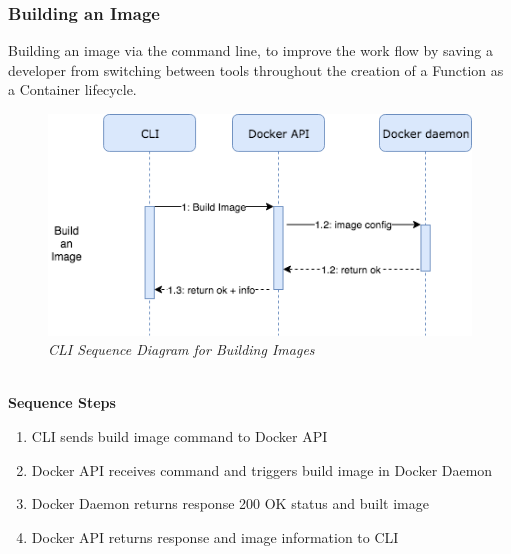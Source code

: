 \subsubsection{Building an Image}
Building an image via the command line, to improve the work flow by saving a developer from switching between tools throughout the creation of a Function as a Container lifecycle.
\begin{figure}[!ht]
\centering
\includegraphics*[width=1\textwidth]{images/sec-build-img.png}
\caption{\em CLI Sequence Diagram for Building Images}
\label{img:cli_seq1}
\end{figure}
\\\textbf{Sequence Steps}
\begin{enumerate}
  \item CLI sends build image command to Docker API
  \item Docker API receives command and triggers build image in Docker Daemon
  \item Docker Daemon returns response 200 OK status and built image
  \item Docker API returns response and image information to CLI
\end{enumerate}
\clearpage

